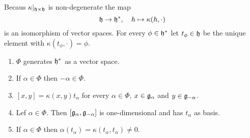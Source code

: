 \begin{definition}
 Becaus $\kappa|_{\mathfrak{h} \times \mathfrak{h}}$ is non-degenerate the map
 \[
  \mathfrak{h} \to \mathfrak{h}^*, \quad h \mapsto \kappa(h, \cdot)
 \]
 is an isomorphism of vector spaces. For every $\phi \in \mathfrak{h}^*$ let $t_\phi \in \mathfrak{h}$ be the unique element with $\kappa(t_\phi, \cdot) = \phi$.
\end{definition}


\begin{proposition}
 \begin{enumerate}[leftmargin=*]
  \item 
   $\Phi$ generates $\mathfrak{h}^*$ as a vector space.
  \item
   If $\alpha \in \Phi$ then $-\alpha \in \Phi$.
  \item
   $[x,y] = \kappa(x,y) t_\alpha$ for every $\alpha \in \Phi$, $x \in \mathfrak{g}_\alpha$ and $y \in \mathfrak{g}_{-\alpha}$.
  \item
   Lef $\alpha \in \Phi$. Then $[\mathfrak{g}_\alpha, \mathfrak{g}_{-\alpha}]$ is one-dimensional and has $t_\alpha$ as basis.
  \item
   If $\alpha \in \Phi$ then $\alpha(t_\alpha) = \kappa(t_\alpha, t_\alpha) \neq 0$.
 \end{enumerate}
\end{proposition}
